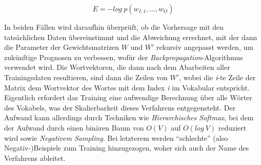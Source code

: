 \begin{equation}
  E = - log\ p(w_{I,1}, \ldots, w_O)
\end{equation}

In beiden Fällen wird daraufhin überprüft, ob die Vorhersage mit den tatsächlichen Daten übereinstimmt und die Abweichung
errechnet, mit der dann die Parameter der Gewichtsmatrizen $W$ und $W'$ rekursiv angepasst werden, um zukünftige Prognosen
zu verbessen, wofür der \emph{Backpropagation}-Algorithmus verwendet wird. Die Wortvektoren, die dann nach dem Abarbeiten aller Trainingsdaten resultieren, sind dann die Zeilen von
$W'$, wobei die \emph{i}-te Zeile der Matrix dem Wortvektor des Wortes mit dem Index \emph{i} im Vokabular entspricht.\\
Eigentlich erfordert das Training eine aufwendige Berechnung über alle Wörter des Vokabels, was der Skalierbarkeit dieses
Verfahrens entgegensteht. Der Aufwand kann allerdings durch Techniken wie \emph{Hierarchisches Softmax}, bei dem
der Aufwand durch einen binären Baum von $O(V)$ auf $O(log\ V)$ reduziert wird sowie
\emph{Negativem Sampling}. Bei letzterem werden ``schlechte'' (also Negativ-)Beispiele zum Training hinzugezogen,
woher sich auch der Name des Verfahrens ableitet.\\

%

